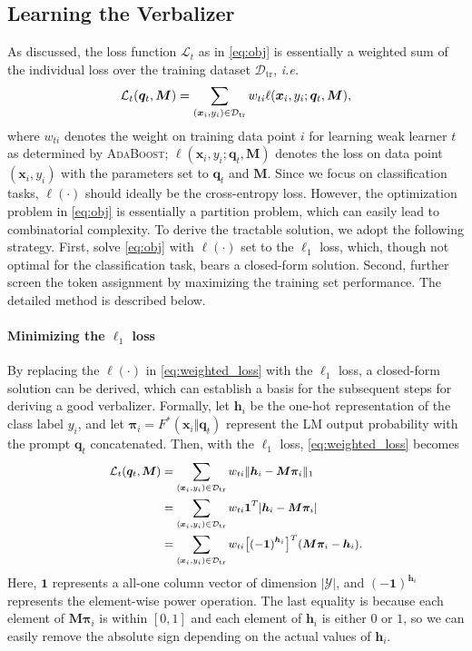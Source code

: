 \documentclass{article}
\theoremstyle{plain}
\theoremstyle{definition}
\theoremstyle{remark}
\begin{document}
\subsection{Learning the Verbalizer}
\label{sec: verbalizer_learning}
As discussed, the loss function $\mathcal{L}_t$ as in \eqref{eq:obj} is essentially a weighted sum of the individual loss over the training dataset $\mathcal{D}_{\mathrm{tr}}$, \emph{i.e.}
\begin{equation}
\small
    \mathcal{L}_t(\bm q_t, \bm M) = \sum_{(\bm x_i, y_i) \in \mathcal{D}_{\mathrm{tr}}} w_{ti} \ell(\bm x_i, y_i; \bm q_t, \bm M),
    \label{eq:weighted_loss}
\end{equation}
where $w_{ti}$ denotes the weight on training data point $i$ for learning weak learner $t$ as determined by \textsc{AdaBoost}; $\ell(\bm x_i, y_i; \bm q_t, \bm M)$ denotes the loss on data point $(\bm x_i, y_i)$ with the parameters set to $\bm q_t$ and $\bm M$. Since we focus on classification tasks, $\ell(\cdot)$ should ideally be the cross-entropy loss. However, the optimization problem in \eqref{eq:obj} is essentially a partition problem, which can easily lead to combinatorial complexity. To derive the tractable solution, we adopt the following strategy. First, solve \eqref{eq:obj} with $\ell(\cdot)$ set to the $\ell_1$ loss, which, though not optimal for the classification task, bears a closed-form solution. Second, further screen the token assignment by maximizing the training set performance. The detailed method is described below.

\paragraph{Minimizing the $\ell_1$ loss} 
By replacing the $\ell(\cdot)$ in \eqref{eq:weighted_loss} with the $\ell_1$ loss, a closed-form solution can be derived, which can establish a basis for the subsequent steps for deriving a good verbalizer. Formally, let $\bm h_i$ be the one-hot representation of the class label $y_i$, and let $\bm \pi_i =  F^*(\bm x_i \Vert \bm q_t)$ represent the LM output probability with the prompt $\bm q_t$ concatenated. Then, 
with the $\ell_1$ loss, \eqref{eq:weighted_loss} becomes
\begin{equation}
\small
\begin{aligned}
    \mathcal{L}_t(\bm q_t, \bm M) &= \sum_{(\bm x_i, y_i) \in \mathcal{D}_{\mathrm{tr}}} w_{ti} \lVert\bm h_i - \bm M \bm \pi_i \rVert_1 \\
    &= \sum_{(\bm x_i, y_i) \in \mathcal{D}_{\mathrm{tr}}} w_{ti} \bm{1}^T |\bm h_i - \bm M \bm \pi_i | \\
    &= \sum_{(\bm x_i, y_i) \in \mathcal{D}_{\mathrm{tr}}} w_{ti} \big[(-\bm{1})^{\bm h_i}\big]^T (\bm M \bm \pi_i - \bm h_i).
\end{aligned}
\label{eq:l1_loss}
\end{equation}
Here, $\bm{1}$ represents a all-one column vector of dimension $|\mathcal{Y}|$, and $(-\bm{1})^{\bm h_i}$ represents the element-wise power operation. The last equality is because each element of $\bm M \bm \pi_i$ is within $[0, 1]$ and each element of $\bm h_i$ is either $0$ or $1$, 
so we can easily remove the absolute sign depending on the actual values of $\bm h_i$.
\end{document}
